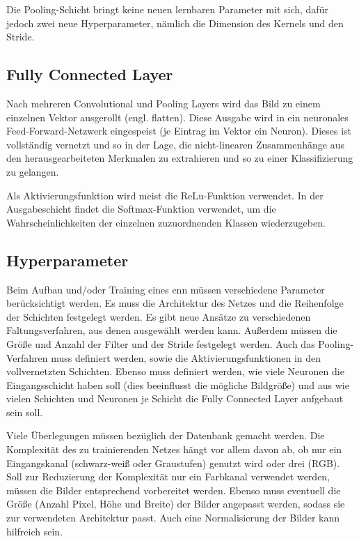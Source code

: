 Die Pooling-Schicht bringt keine neuen lernbaren Parameter mit sich, dafür jedoch zwei neue Hyperparameter, 
nämlich die Dimension des Kernels und den Stride. \cite{Michelucci:2019}

\subsection{Fully Connected Layer}
Nach mehreren Convolutional und Pooling Layers wird das Bild zu einem einzelnen Vektor ausgerollt (engl. flatten). 
Diese Ausgabe wird in ein neuronales Feed-Forward-Netzwerk eingespeist (je Eintrag im Vektor ein Neuron). 
Dieses ist vollständig vernetzt und so in der Lage, die nicht-linearen Zusammenhänge aus den herausgearbeiteten 
Merkmalen zu extrahieren und so zu einer Klassifizierung zu gelangen.\cite{Saha:2018}

Als Aktivierungsfunktion wird meist die ReLu-Funktion verwendet. In der Ausgabeschicht findet die Softmax-Funktion verwendet, 
um die Wahrscheinlichkeiten der einzelnen zuzuordnenden Klassen wiederzugeben. \cite{Arunava:2018}

\subsection{Hyperparameter}
Beim Aufbau und/oder Training eines \ac{cnn} müssen verschiedene Parameter berücksichtigt werden. 
Es muss die Architektur des Netzes und die Reihenfolge der Schichten festgelegt werden. 
Es gibt neue Ansätze zu verschiedenen Faltungsverfahren, aus denen ausgewählt werden kann. 
Außerdem müssen die Größe und Anzahl der Filter und der Stride festgelegt werden. 
Auch das Pooling-Verfahren muss definiert werden, sowie die Aktivierungsfunktionen in den vollvernetzten Schichten. 
Ebenso muss definiert werden, wie viele Neuronen die Eingangsschicht haben soll (dies beeinflusst die mögliche Bildgröße) 
und aus wie vielen Schichten und Neuronen je Schicht die Fully Connected Layer aufgebaut sein soll.

Viele Überlegungen müssen bezüglich der Datenbank gemacht werden. Die Komplexität des zu trainierenden Netzes 
hängt vor allem davon ab, ob nur ein Eingangskanal (schwarz-weiß oder Graustufen) genutzt wird oder drei (RGB). 
Soll zur Reduzierung der Komplexität nur ein Farbkanal verwendet werden, müssen die Bilder entsprechend vorbereitet werden. 
Ebenso muss eventuell die Größe (Anzahl Pixel, Höhe und Breite) der Bilder angepasst werden, sodass sie zur verwendeten Architektur passt. 
Auch eine Normalisierung der Bilder kann hilfreich sein.

